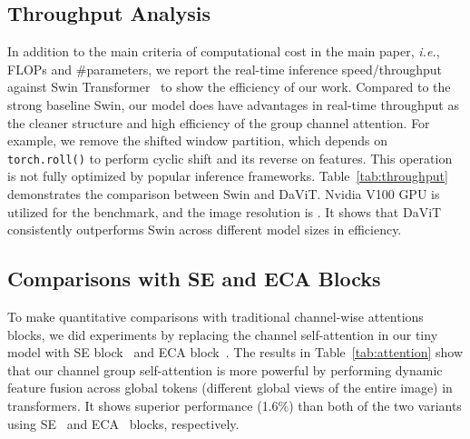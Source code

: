 \documentclass[runningheads]{llncs}
\newcommand{\ie}{\emph{i.e.}}
\begin{document}
\subsection{Throughput Analysis}
In addition to the main criteria of computational cost in the main paper, \ie, FLOPs and \#parameters, we report the real-time inference speed/throughput against Swin Transformer~\cite{liu2021swin} to show the efficiency of our work.
Compared to the strong baseline Swin, our model does have advantages in real-time throughput as the cleaner structure and high efficiency of the group channel attention. For example, we remove the shifted window partition, which depends on \texttt{torch.roll()} to perform cyclic shift and its reverse on features. This operation is not fully optimized by popular inference frameworks. Table~\ref{tab:throughput} demonstrates the comparison between Swin and DaViT. Nvidia V100 GPU is utilized for the benchmark, and the image resolution is . It shows that DaViT consistently outperforms Swin across different model sizes in efficiency.



\subsection{Comparisons with SE and ECA Blocks}
To make quantitative comparisons with traditional channel-wise attentions blocks, we did experiments by replacing the channel self-attention in our tiny model with SE block~\cite{hu2018squeeze} and ECA block~\cite{wang2020eca}.
The results in Table~\ref{tab:attention} show that our channel group self-attention is more powerful by performing dynamic feature fusion across global tokens (different global views of the entire image) in transformers. It shows superior performance (1.6\%) than both of the two variants using SE~\cite{hu2018squeeze} and ECA~\cite{wang2020eca} blocks, respectively.



\end{document}
